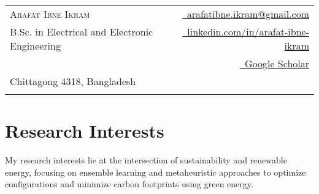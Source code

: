 \documentclass[a4paper,11pt]{article}
\begin{document}
 \pagestyle{empty}  %



 \begin{tabularx}{\linewidth}{@{}L @{}R}
 	\titleHeading\Huge\scshape Arafat Ibne Ikram & \href{mailto:arafatibne.ikram@gmail.com}{\raisebox{0.0\height}{\footnotesize \faEnvelope}\ {arafatibne.ikram@gmail.com}} \\
 	
 	{B.Sc. in Electrical and Electronic Engineering} & \href{www.linkedin.com/in/arafat-ibne-ikram/}{\raisebox{0.0\height}{\footnotesize \faLinkedin}\ {linkedin.com/in/arafat-ibne-ikram}}\\
                                                 
 	{} & \href{https://scholar.google.com/citations?user=gml3L4MAAAAJ} {\raisebox{0.0\height}{\footnotesize \faGraduationCap}\ {Google Scholar}} \\
 	
 	{Chittagong 4318, Bangladesh} & \href{https://arafatikram.github.io} {\raisebox{0.0\height}{\footnotesize \faLink} {}}\\
 	\\
 \end{tabularx}\vspace{2pt}
 
 
 
 
 
 
 
 
 
\section{Research Interests} \vspace{2pt}
My research interests lie at the intersection of sustainability and renewable energy, focusing on ensemble learning and metaheuristic approaches to optimize configurations and minimize carbon footprints using green energy. 
\vspace{2pt}
\end{document}
